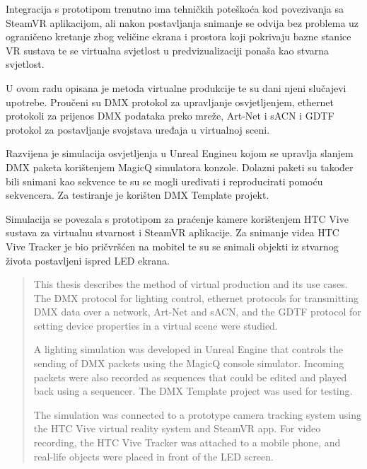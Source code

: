 \documentclass[times, utf8, zavrsni, numeric]{fer}
\begin{document}
Integracija s prototipom trenutno ima tehničkih poteškoća kod povezivanja sa SteamVR aplikacijom, ali nakon postavljanja snimanje se odvija bez problema uz ograničeno kretanje zbog veličine ekrana i prostora koji pokrivaju bazne stanice VR sustava te se virtualna svjetlost u predvizualizaciji ponaša kao stvarna svjetlost.

\raggedright



\begin{sazetak}
U ovom radu opisana je metoda virtualne produkcije te su dani njeni slučajevi upotrebe. Proučeni su DMX protokol za upravljanje osvjetljenjem, ethernet protokoli za prijenos DMX podataka preko mreže, Art-Net i sACN i GDTF protokol za postavljanje svojstava uređaja u virtualnoj sceni. \newline

Razvijena je simulacija osvjetljenja u Unreal Engineu kojom se upravlja slanjem DMX paketa korištenjem MagicQ simulatora konzole. Dolazni paketi su također bili snimani kao sekvence te su se mogli uređivati i reproducirati pomoću sekvencera. Za testiranje je korišten DMX Template projekt. \newline

Simulacija se povezala s prototipom za praćenje kamere korištenjem HTC Vive sustava za virtualnu stvarnost i SteamVR aplikacije. Za snimanje videa HTC Vive Tracker je bio pričvršćen na mobitel te su se snimali objekti iz stvarnog života postavljeni ispred LED ekrana.

\end{sazetak}

\pagebreak

\begin{abstract}
This thesis describes the method of virtual production and its use cases. The DMX protocol for lighting control, ethernet protocols for transmitting DMX data over a network, Art-Net and sACN, and the GDTF protocol for setting device properties in a virtual scene were studied. \newline

A lighting simulation was developed in Unreal Engine that controls the sending of DMX packets using the MagicQ console simulator. Incoming packets were also recorded as sequences that could be edited and played back using a sequencer. The DMX Template project was used for testing. \newline

The simulation was connected to a prototype camera tracking system using the HTC Vive virtual reality system and SteamVR app. For video recording, the HTC Vive Tracker was attached to a mobile phone, and real-life objects were placed in front of the LED screen.

\end{abstract}
\end{document}
